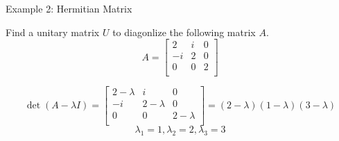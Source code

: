 \documentclass{beamer}
\begin{document}
\begin{frame}{Example 2: Hermitian Matrix}
    \begin{example}
        Find a unitary matrix $U$ to diagonlize the following matrix $A$.
        \begin{equation*}
            A=\left[ \begin{matrix}
                2&		i&		0\\
                -i&		2&		0\\
                0&		0&		2\\
            \end{matrix} \right]
        \end{equation*}
    \end{example}
\begin{equation*}
    \det \left( A-\lambda I \right) =\left[ \begin{matrix}
        2-\lambda&		i&		0\\
        -i&		2-\lambda&		0\\
        0&		0&		2-\lambda\\
    \end{matrix} \right] =\left( 2-\lambda \right) \left( 1-\lambda \right) \left( 3-\lambda \right)
\end{equation*}
\begin{equation*}
    \lambda_1=1, \lambda_2=2, \lambda_3=3
\end{equation*}
\end{frame}
\end{document}
